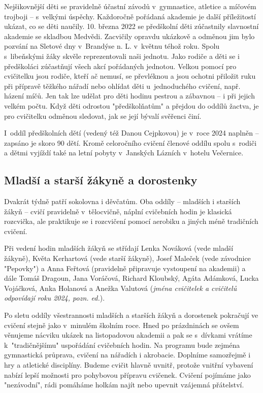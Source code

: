\documentclass[a5paper, 11pt, twoside]{article}
\begin{document}
Nejšikovnější děti se pravidelně účastní závodů v~gymnastice, atletice a
míčovém trojboji -- s~velkými úspěchy. Každoročně pořádaná akademie je
další příležitostí ukázat, co se děti naučily. 10. března 2022 se
předškolní děti zúčastnily slavnostní akademie se skladbou Medvědi.
Zacvičily opravdu ukázkově a odměnou jim bylo pozvání na Sletové dny
v~Brandýse n. L. v~květnu téhož roku. Spolu s~libeňskými žáky skvěle
reprezentovali naši jednotu. Jako rodiče a děti se i předškoláci
zúčastňují všech akcí pořádaných jednotou. Velkou pomocí pro cvičitelku
jsou rodiče, kteří ač nemusí, se převléknou a jsou ochotni přiložit ruku
při přípravě těžkého nářadí nebo ohlídat děti u~jednoduchého cvičení,
např. házení míčů. Jen tak lze udělat pro děti hodinu pestrou a zábavnou
-- i při jejich velkém počtu. Když děti odrostou "předškolňatům" a
přejdou do oddílů žactva, je pro cvičitelku odměnou sledovat, jak se
její bývalí svěřenci činí.

I~oddíl předškolních dětí (vedený též Danou Cejpkovou) je v~roce 2024
naplněn -- zapsáno je skoro 90 dětí. Kromě celoročního cvičení členové
oddílu spolu s~rodiči a dětmi vyjíždí také na letní pobyty v~Janských
Lázních v~hotelu Večernice.

\subsection{Mladší a starší žákyně a
dorostenky}

Dvakrát týdně patří sokolovna i děvčatům. Oba oddíly -- mladších i
starších žákyň -- cvičí pravidelně v~tělocvičně, náplní cvičebních hodin
je klasická rozcvička, ale praktikuje se i rozcvičení pomocí aerobiku a
jiných méně tradičních cvičení.

Při vedení hodin mladších žákyň se střídají Lenka Nováková (vede mladší
žákyně), Květa Kerhartová (vede starší žákyně), Josef Maleček (vede
závodnice "Pepovky") a Anna Feřtová (pravidelně připravuje vystoupení
na akademii) a dále Tomáš Dragoun, Jana Voráčová, Richard Kloubský,
Agáta Adámková, Lucka Vojáčková, Anka Holanová a Anežka Valutová
(\textit{jména cvičitelek a cvičitelů odpovídají roku 2024, pozn. ed.}).

Po sletu oddíly všestrannosti mladších a starších žákyň a dorostenek
pokračují ve cvičení stejně jako v~minulém školním roce. Hned po
prázdninách se ovšem věnujeme nácviku ukázek na listopadovou akademii a
pak se s~dívkami vrátíme k~"tradičnějšímu" uspořádání cvičebních
hodin. Na programu bude zejména gymnastická průprava, cvičení na
nářadích i akrobacie. Doplníme samozřejmě i hry a atletické disciplíny.
Budeme cvičit hlavně uvnitř, protože vnitřní vybavení nabízí lepší
možnosti pro pohybovou přípravu cvičenek. Cvičení pojímáme jako
"nezávodní", rádi pomáháme holkám najít nebo upevnit vzájemná
přátelství.
\end{document}
